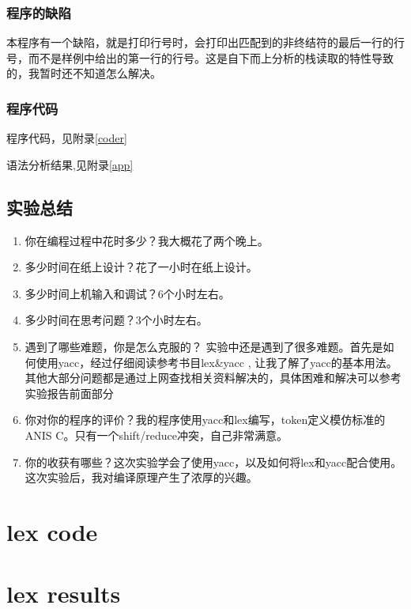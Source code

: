 \documentclass{article}
\begin{document}
\begin{CJK}{UTF8}{gkai}
\subsubsection{程序的缺陷}
本程序有一个缺陷，就是打印行号时，会打印出匹配到的非终结符的最后一行的行号，而不是样例中给出的第一行的行号。这是自下而上分析的栈读取的特性导致的，我暂时还不知道怎么解决。

\subsubsection{程序代码}
程序代码，见附录\ref{coder}

语法分析结果,见附录\ref{app}
\subsection{实验总结}
\begin{enumerate}
\item 你在编程过程中花时多少？我大概花了两个晚上。
\item  多少时间在纸上设计？花了一小时在纸上设计。
\item  多少时间上机输入和调试？6个小时左右。
\item  多少时间在思考问题？3个小时左右。
\item  遇到了哪些难题，你是怎么克服的？ 实验中还是遇到了很多难题。首先是如何使用yacc，经过仔细阅读参考书目lex\&yacc \cite{levine1992lex}, 让我了解了yacc的基本用法。其他大部分问题都是通过上网查找相关资料解决的，具体困难和解决可以参考实验报告前面部分
\item  你对你的程序的评价？我的程序使用yacc和lex编写，token定义模仿标准的ANIS C。只有一个shift/reduce冲突，自己非常满意。
\item  你的收获有哪些？这次实验学会了使用yacc，以及如何将lex和yacc配合使用。这次实验后，我对编译原理产生了浓厚的兴趣。
\end{enumerate}

\clearpage
{\small
	
	
}
\clearpage

\appendix
\section{lex code}\label{code}


\clearpage
\section{lex results}\label{append}


\end{CJK}
\end{document}
